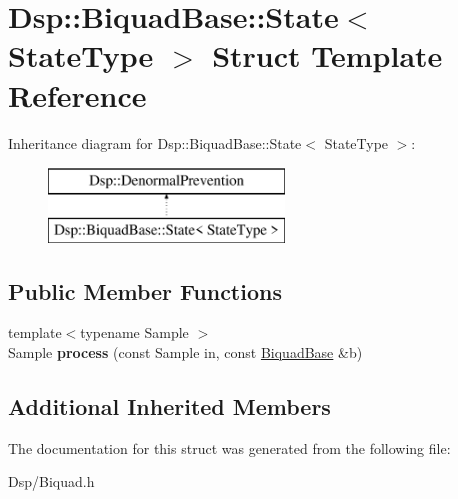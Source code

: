 \hypertarget{structDsp_1_1BiquadBase_1_1State}{\section{Dsp\-:\-:Biquad\-Base\-:\-:State$<$ State\-Type $>$ Struct Template Reference}
\label{structDsp_1_1BiquadBase_1_1State}
}
Inheritance diagram for Dsp\-:\-:Biquad\-Base\-:\-:State$<$ State\-Type $>$\-:\begin{figure}[H]
\begin{center}
\leavevmode
\includegraphics[height=2.000000cm]{structDsp_1_1BiquadBase_1_1State}
\end{center}
\end{figure}
\subsection*{Public Member Functions}
\begin{DoxyCompactItemize}
\item 
\hypertarget{structDsp_1_1BiquadBase_1_1State_a22f8fe5951d21bd49012611aae6afc0a}{{\footnotesize template$<$typename Sample $>$ }\\Sample {\bfseries process} (const Sample in, const \hyperlink{classDsp_1_1BiquadBase}{Biquad\-Base} \&b)}\label{structDsp_1_1BiquadBase_1_1State_a22f8fe5951d21bd49012611aae6afc0a}

\end{DoxyCompactItemize}
\subsection*{Additional Inherited Members}


The documentation for this struct was generated from the following file\-:\begin{DoxyCompactItemize}
\item 
Dsp/Biquad.\-h\end{DoxyCompactItemize}
